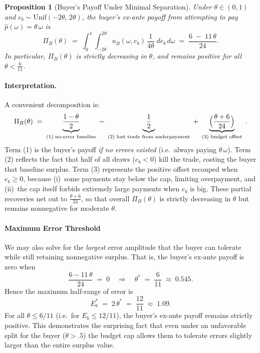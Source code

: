 \documentclass{article}
\newtheorem{proposition}[theorem]{Proposition}
\begin{document}
\begin{proposition}[Buyer’s Payoff Under Minimal Separation]
\label{prop:buyer-min-sep}
Under $\theta \in (0,1)$ and $e_b \sim \mathrm{Unif}(-2\theta,\,2\theta)$, 
the buyer’s \emph{ex‐ante payoff} from attempting to pay 
$\hat{p}(\omega) = \theta\,\omega$ is
\begin{equation}
\label{eq:PiB-min-sep}
  \Pi_B(\theta)
  \;=\;
  \int_0^1 \!\!\int_{-2\theta}^{2\theta}
    u_B(\omega,e_b)\,\frac{1}{4\theta}
  \;d e_b\,d\omega
  \;=\;
  \frac{6 \;-\; 11\,\theta}{24}.
\end{equation}
In particular, $\Pi_B(\theta)$ is strictly decreasing in $\theta$, 
and remains positive for all $\theta < \tfrac{6}{11}$.
\end{proposition}

\paragraph{Interpretation.}
A convenient decomposition is:
\begin{equation}
\label{eq:PiB-decompose}
  \Pi_B(\theta) 
  \;=\;
  \underbrace{\frac{1-\theta}{2}}_{\text{(1) no‐error baseline}} 
  \;-\;
  \underbrace{\frac{1}{2}}_{\text{(2) lost trade from underpayment}} 
  \;+\;
  \underbrace{\Bigl(\frac{\theta+6}{24}\Bigr)}_{\text{(3) budget offset}}
  \;.
\end{equation}
Term (1) is the buyer’s payoff \emph{if no errors existed} 
(i.e.\ always paying $\theta\,\omega$).  
Term (2) reflects the fact that half of all draws ($e_b<0$) kill the trade, 
costing the buyer that baseline surplus.  
Term (3) represents the positive offset recouped when $e_b \ge 0$, 
because (i)~some payments stay below the cap, limiting overpayment, 
and (ii)~the cap itself forbids extremely large payments when $e_b$ is big.  
These partial recoveries net out to $\tfrac{\theta+6}{24}$, 
so that overall $\Pi_B(\theta)$ is strictly decreasing in $\theta$ 
but remains nonnegative for moderate $\theta$.

\paragraph{Maximum Error Threshold}
We may also solve for the \emph{largest} error amplitude 
that the buyer can tolerate while still retaining 
nonnegative surplus.  That is, the buyer’s ex‐ante payoff is zero when
\[
  \frac{6 - 11\,\theta}{24} \;=\; 0
  \quad\Longrightarrow\quad
  \theta^* \;=\; \frac{6}{11}\;\approx\;0.545.
\]
Hence the maximum half‐range of error is
\[
  E_b^* \;=\; 2\,\theta^*
  \;=\;
  \frac{12}{11}
  \;\approx\;1.09.
\]
For all \(\theta \le 6/11\) 
(i.e.\ for \(E_b \le 12/11\)), 
the buyer’s ex‐ante payoff remains strictly positive.  
This demonstrates the surprising fact that even under an unfavorable split for the buyer ($\theta>.5$) the budget cap allows them to tolerate errors slightly larger than the entire surplus value.
\end{document}
